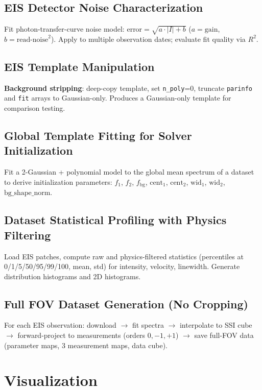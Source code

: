 \documentclass[11pt,a4paper]{article}
\begin{document}
\subsection{EIS Detector Noise Characterization}
Fit photon-transfer-curve noise model: $\text{error} = \sqrt{a \cdot |I| + b}$ ($a = \text{gain}$, $b = \text{read-noise}^2$). Apply to multiple observation dates; evaluate fit quality via $R^2$.

\subsection{EIS Template Manipulation}
\textbf{Background stripping}: deep-copy template, set \texttt{n\_poly}=0, truncate \texttt{parinfo} and \texttt{fit} arrays to Gaussian-only. Produces a Gaussian-only template for comparison testing.

\subsection{Global Template Fitting for Solver Initialization}
Fit a 2-Gaussian + polynomial model to the global mean spectrum of a dataset to derive initialization parameters: $f_1$, $f_2$, $f_{\text{bg}}$, $\text{cent}_1$, $\text{cent}_2$, $\text{wid}_1$, $\text{wid}_2$, $\text{bg\_shape\_norm}$.

\subsection{Dataset Statistical Profiling with Physics Filtering}
Load EIS patches, compute raw and physics-filtered statistics (percentiles at 0/1/5/50/95/99/100, mean, std) for intensity, velocity, linewidth. Generate distribution histograms and 2D histograms.

\subsection{Full FOV Dataset Generation (No Cropping)}
For each EIS observation: download $\rightarrow$ fit spectra $\rightarrow$ interpolate to SSI cube $\rightarrow$ forward-project to measurements (orders $0, -1, +1$) $\rightarrow$ save full-FOV data (parameter maps, 3 measurement maps, data cube).

\section{Visualization}
\end{document}
